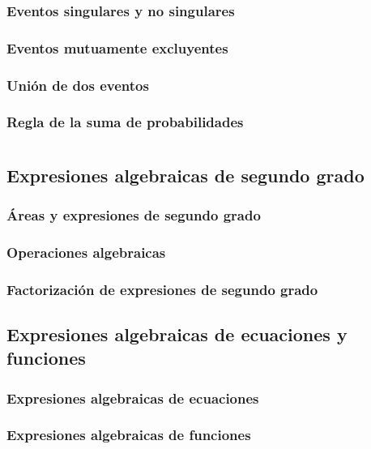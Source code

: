 \documentclass[11pt]{book}
\begin{document}
\subsection{Eventos singulares y no singulares}
\subsection{Eventos mutuamente excluyentes}
\subsection{Unión de dos eventos}
\subsection{Regla de la suma de probabilidades}

\chapter{}

\newpage \thispagestyle{plain}
\section{Expresiones algebraicas de segundo grado}
\subsection{Áreas y expresiones de segundo grado}
\subsection{Operaciones algebraicas}
\subsection{Factorización de expresiones de segundo grado}

\newpage \thispagestyle{plain}
\section{Expresiones algebraicas de ecuaciones y funciones}
\subsection{Expresiones algebraicas de ecuaciones}
\subsection{Expresiones algebraicas de funciones}
\end{document}
